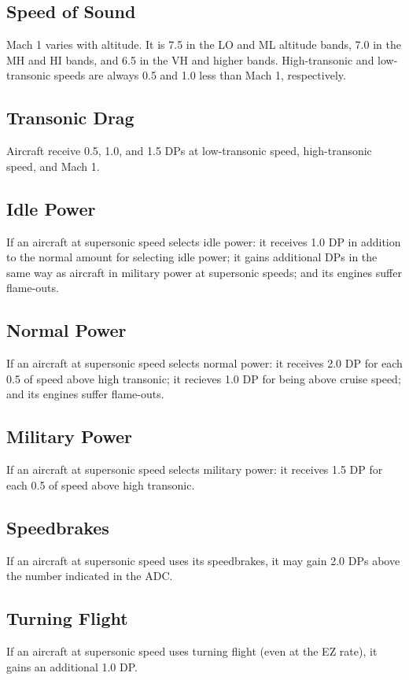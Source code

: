 \documentclass[10pt]{extarticle}
\begin{document}
\subsection{Speed of Sound} Mach 1 varies with altitude. It is 7.5 in the LO and ML altitude bands, 7.0 in the MH and HI bands, and 6.5 in the VH and higher bands. High-transonic and low-transonic speeds are always 0.5 and 1.0 less than Mach 1, respectively.

\subsection{Transonic Drag} Aircraft receive 0.5, 1.0, and 1.5 DPs at low-transonic speed, high-transonic speed, and Mach 1.

\subsection{Idle Power} If an aircraft at supersonic speed selects idle power: it receives 1.0 DP in addition to the normal amount for selecting idle power; it gains additional DPs in the same way as aircraft in military power at supersonic speeds; and its engines suffer flame-outs.

\subsection{Normal Power} If an aircraft at supersonic speed selects normal power: it receives 2.0 DP for each 0.5 of speed above high transonic; it recieves 1.0 DP for being above cruise speed; and its engines suffer flame-outs.

\subsection{Military Power} If an aircraft at supersonic speed selects military power: it receives 1.5 DP for each 0.5 of speed above high transonic.

\subsection{Speedbrakes} If an aircraft at supersonic speed uses its speedbrakes, it may gain 2.0 DPs above the number indicated in the ADC.

\subsection{Turning Flight} If an aircraft at supersonic speed uses turning flight (even at the EZ rate), it gains an additional 1.0 DP.
\end{document}

